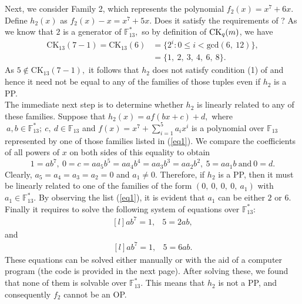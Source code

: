 \documentclass[12pt,a4wide, reqno]{amsart}
\theoremstyle{definition}
\theoremstyle{remark}
\numberwithin{equation}{section}
\begin{document}
Next, we consider Family 2, which represents the polynomial $f_2(x)=x^7+6x.$ Define $h_2(x)$ as $f_2(x)-x=x^7+5x.$ Does it satisfy the requirements of ? As we know that $2$ is a generator of $\mathbb{F}_{13}^*,$ so by definition of $\textup{CK}_q(m)$, we have
\begin{equation*}
    \begin{aligned}
        \text{CK}_{13}(7-1)=\text{CK}_{13}(6)&=\{2^i: 0\leq i < \text{gcd}(6,~12)\},\\
        &=\{1,~2,~3,~4,~6,~8\}.
    \end{aligned}
\end{equation*}
As $5\notin\text{CK}_{13}(7-1),$ it follows that $h_2$ does not satisfy condition (1) of  and hence it need not be equal to any of the families of those tuples even if $h_2$ is a PP. \\The immediate next step is to determine whether $h_2$ is linearly related to any of these families. Suppose that $h_2(x)=af(bx+c)+d,$ where $~a,b\in\mathbb{F}_{13}^*;~c,~d\in\mathbb{F}_{13}$ and $f(x)=x^7+\sum_{i=1}^{5}a_ix^i$ is a polynomial over $\mathbb{F}_{13}$ represented by one of those families listed in (\ref{eq1}). We compare the coefficients of all powers of $x$ on both sides of this equality to obtain
$$1=ab^7,~0=c=aa_5b^5=aa_4b^4=aa_3b^3=aa_2b^2,~5=aa_1b~\text{and}~0=d.$$
Clearly, $a_5=a_4=a_3=a_2=0$ and $a_1\neq 0.$ Therefore, if $h_2$ is a PP, then it must be linearly related to one of the families of the form $(0,~0,~0,~0,~a_1)$ with $a_1\in\mathbb{F}_{13}^*.$ By observing the list (\ref{eq1}), it is evident that $a_1$ can be either $2$ or $6.$ Finally it requires to solve the following system of equations over $\mathbb{F}_{13}^*:$
\begin{equation}
    \begin{matrix*}[l]
         ab^7=1, & 5=2ab,
    \end{matrix*}
\end{equation}
and
\begin{equation}
    \begin{matrix*}[l]
         ab^7=1, & 5=6ab.
    \end{matrix*}
\end{equation}
These equations can be solved either manually or with the aid of a computer program (the code is provided in the next page). After solving these, we found that none of them is solvable over $\mathbb{F}_{13}^*.$ This means that $h_2$ is not a PP, and consequently $f_2$ cannot be an OP. 
\end{document}
